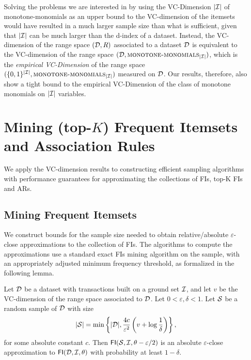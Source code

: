 Solving the problems we are interested in by using the VC-Dimension $|{\cal I}|$ of
monotone-monomials as an upper bound to the VC-dimension of the itemsets would
have resulted in a much larger sample size than what is sufficient, given that
$|{\cal I}|$ can be much larger than the d-index of a dataset. Instead, the
VC-dimension of the range space $({\cal D},R)$ associated to a dataset ${\cal D}$ is
equivalent to the VC-dimension of the range space
$({\cal D},\textsc{monotone-monomials}_{|{\cal I}|})$, which is the \emph{empirical
VC-Dimension} of the range space
$(\{0,1\}^{|{\cal I}|},\textsc{monotone-monomials}_{|{\cal I}|})$ measured on ${\cal D}$. Our
results, therefore, also show a tight bound to the empirical VC-Dimension of the
class of monotone monomials on $|{\cal I}|$ variables. 

  
\section{Mining (top-$K$) Frequent Itemsets and Association Rules}\label{sec:vcmineapprox}
We apply the VC-dimension results to constructing efficient sampling algorithms
with performance guarantees for approximating the collections of FIs, top-K FIs and ARs.

\subsection{Mining Frequent Itemsets}\label{sec:vcmineabsapproxfi}
We construct bounds for the sample size needed to obtain
relative/absolute $\varepsilon$-close approximations to the collection of FIs. The
algorithms to compute the approximations use a standard
exact FIs mining algorithm on the sample, with an appropriately adjusted minimum
frequency threshold, as formalized in the following lemma.

\begin{lemma}\label{lem:absapproxfi}
  Let ${\cal D}$ be a dataset with transactions built on a ground set ${\cal I}$, and let
  $v$ be the VC-dimension of the range space associated to ${\cal D}$. Let
  $0<\varepsilon,\delta<1$. Let ${\cal S}$ be a random sample of ${\cal D}$ with size 
  \[
  |{\cal S}|=\min\left\{|{\cal D}|,\frac{4c}{\varepsilon^2}\left(v+\log\frac{1}{\delta}\right)\right\},\]
  for some absolute constant $c$. Then $\mathsf{FI}({\cal S},{\cal I},\theta-\varepsilon/2)$ is an absolute
  $\varepsilon$-close approximation to $\mathsf{FI}({\cal D},{\cal I},\theta)$ with probability
  at least $1-\delta$.
\end{lemma}

